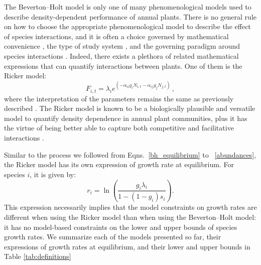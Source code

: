 \begin{refsection}
The Beverton--Holt model is only one of many phenomenological models used to describe density-dependent performance of annual plants. There is no general rule on how to choose the appropriate phenomenological model to describe the effect of species interactions, and it is often a choice governed by mathematical convenience \citep{mayfield2017higher}, the type of study system \citep{godwin2020empiricist}, and the governing paradigm around species interactions \citep{martyn2021identifying}. Indeed, there exists a plethora of related mathematical expressions that can quantify interactions between plants. One of them is the Ricker  model:
 \begin{equation}
 \label{Ricker}
   F_{i,t} = \lambda_{i} e^{(- \alpha_{ii}g_{i}N_{i,t} - \alpha_{ij}g_{j}N_{j,t})}\,,
\end{equation}
where the interpretation of the parameters remains the same as previously described \citep{ricker1954effects}. The Ricker model is known to be a biologically plausible and versatile model to quantify density dependence in annual plant communities, plus it has the virtue of being better able to capture both competitive and facilitative interactions \citep{mayfield2017higher,bimler_accurate_2018}.


Similar to the process we followed from Eqns.~\ref{bh_equilibrium} to ~\ref{abundances}, the Ricker model has its own expression of growth rate at equilibrium. For species $i$, it is given by:
\begin{equation}
  r_{i}=\ln\left(\frac{g_{i}\lambda_{i}}{1-(1-g_{i})s_{i}}\right).
\end{equation}
This expression necessarily implies that the model constraints on growth rates are different when using the Ricker model than when using  the Beverton--Holt model: it has no model-based constraints on the lower and upper bounds of species growth rates. We summarize each of the models presented so far, their expressions of growth rates at equilibrium, and their lower and upper bounds in Table \ref{tab:definitions}


\end{refsection}
